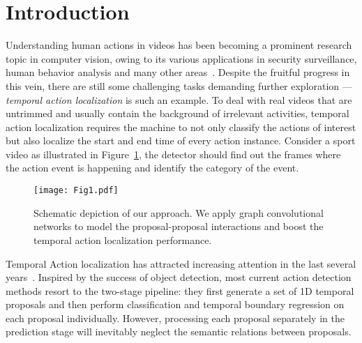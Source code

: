 \documentclass[10pt,twocolumn,letterpaper]{article}
\begin{document}
	
	
\section{Introduction}
	
	Understanding human actions in videos has been becoming a prominent research topic in computer vision, owing to its various applications in security surveillance, human behavior analysis and many other areas~\cite{duan2018weakly,simonyan2014two,tran2015learning,fan2018end,gan2018geometry,gan2015devnet,gan2016recognizing,gan2016you,wang2016temporal}. Despite the fruitful progress in this vein, there are still some challenging tasks demanding further exploration --- \emph{temporal action localization} is such an example. To deal with real videos that are untrimmed and usually contain the background of irrelevant activities, temporal action localization requires the machine to not only classify the actions of interest but also localize the start and end time of every action instance. Consider a sport video as illustrated in Figure~\ref{Fig:simple}, the detector should find out the frames where the action event is happening and identify the category of the event. 
	
	
	\begin{figure}[t]
		\centering
		\texttt{[image: Fig1.pdf]}
		\caption{Schematic depiction of our approach. We apply graph convolutional networks to model the proposal-proposal interactions and boost the temporal action localization performance.}
		\label{Fig:simple}
		\vspace{-0.35cm}
	\end{figure}
	
	
	Temporal Action localization has attracted increasing attention in the last several years~\cite{chao2018rethinking,gao2017cascaded,lin2017single,shou2017cdc,shou2016temporal}. Inspired by the success of object detection, most current action detection methods resort to the two-stage pipeline: they first generate a set of 1D temporal proposals and then perform classification and temporal boundary regression on each proposal individually. 
	However, processing each proposal separately in the prediction stage will inevitably neglect the semantic relations between proposals. 
	
\end{document}
